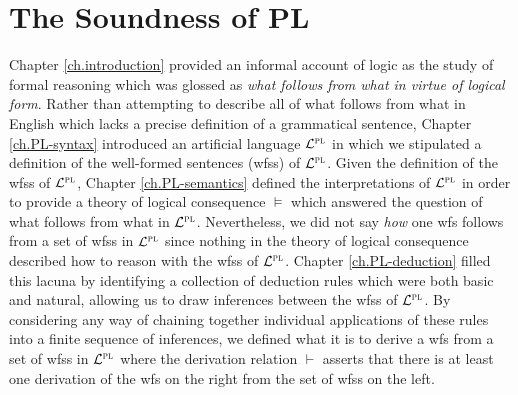 ﻿%
\chapter{The Soundness of PL}
  \label{ch.PL-soundness}


Chapter \ref{ch.introduction} provided an informal account of logic as the study of formal reasoning which was glossed as \textit{what follows from what in virtue of logical form}.
Rather than attempting to describe all of what follows from what in English which lacks a precise definition of a grammatical sentence, Chapter \ref{ch.PL-syntax} introduced an artificial language $\mathcal{L}^{\textsc{pl}}$ in which we stipulated a definition of the well-formed sentences (wfss) of $\mathcal{L}^{\textsc{pl}}$.
Given the definition of the wfss of $\mathcal{L}^{\textsc{pl}}$, Chapter \ref{ch.PL-semantics} defined the interpretations of $\mathcal{L}^{\textsc{pl}}$ in order to provide a theory of logical consequence $\vDash$ which answered the question of what follows from what in $\mathcal{L}^{\textsc{pl}}$. 
Nevertheless, we did not say \textit{how} one wfs follows from a set of wfss in $\mathcal{L}^{\textsc{pl}}$ since nothing in the theory of logical consequence described how to reason with the wfss of $\mathcal{L}^{\textsc{pl}}$.
Chapter \ref{ch.PL-deduction} filled this lacuna by identifying a collection of deduction rules which were both basic and natural, allowing us to draw inferences between the wfss of $\mathcal{L}^{\textsc{pl}}$. 
By considering any way of chaining together individual applications of these rules into a finite sequence of inferences, we defined what it is to derive a wfs from a set of wfss in $\mathcal{L}^{\textsc{pl}}$ where the derivation relation $\vdash$ asserts that there is at least one derivation of the wfs on the right from the set of wfss on the left.

